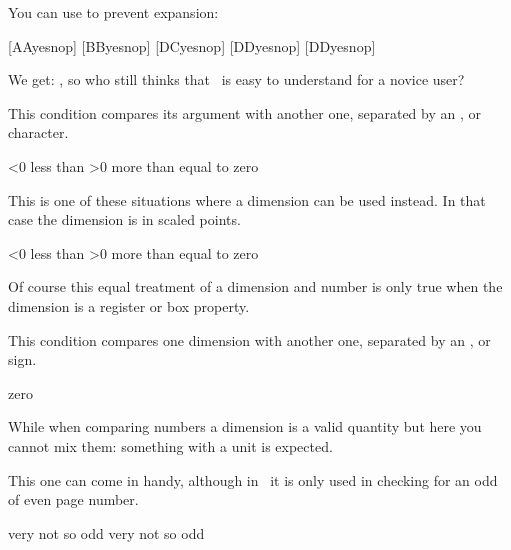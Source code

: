 You can use \type {\noexpand} to prevent expansion:

\startbuffer
\def\A{A}%
\let\B B%
\def\C{D}%
\let\D D%
[\ifcat\noexpand\A Ayes\else nop\fi]
[\ifcat\noexpand\B Byes\else nop\fi]
[\ifcat\noexpand\C Cyes\else nop\fi]
[\ifcat\noexpand\C Dyes\else nop\fi]
[\ifcat\noexpand\D Dyes\else nop\fi]
\stopbuffer

\typebuffer[option=TEX]

We get: \inlinebuffer, so who still thinks that \TEX\ is easy to understand for a
novice user?

\stopsubsection

\startsubsection[title={\tex{ifnum}}]

This condition compares its argument with another one, separated by an \type {<},
\type {=} or \type {>} character.

\starttyping[option=TEX]
\ifnum\scratchcounter<0
    less than
\else\ifnum\scratchcounter>0
    more than
\else
    equal to
\fi zero
\stoptyping

This is one of these situations where a dimension can be used instead. In that
case the dimension is in scaled points.

\starttyping[option=TEX]
\ifnum\scratchdimen<0
    less than
\else\ifnum\scratchdimen>0
    more than
\else
    equal to
\fi zero
\stoptyping

Of course this equal treatment of a dimension and number is only true when the
dimension is a register or box property.

\stopsubsection

\startsection[title={\tex{ifdim}}]

This condition compares one dimension with another one, separated by an \type {<},
\type {=} or \type {>} sign.

\starttyping[option=TEX]
\ifdim\scratchdimen<0pt
    less than
\else\ifdim\scratchdimen>0pt
    more than
\else
    equal to
\fi zero
\stoptyping

While when comparing numbers a dimension is a valid quantity but here you cannot
mix them: something with a unit is expected.

\stopsubsection

\startsubsection[title={\tex{ifodd}}]

This one can come in handy, although in \CONTEXT\ it is only used in checking for
an odd of even page number.

\startbuffer
\scratchdimen  3sp

\ifodd\scratchdimen   very \else not so \fi odd
\ifodd\scratchcounter very \else not so \fi odd
\stopbuffer

